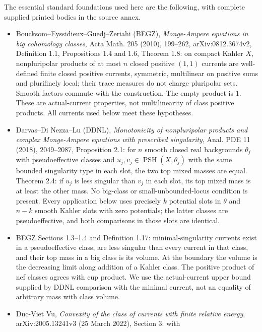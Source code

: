 \documentclass[
  11pt,
]{article}
\providecommand{\tightlist}{%
  \setlength{\itemsep}{0pt}\setlength{\parskip}{0pt}}
\begin{document}
The essential standard foundations used here are the following, with
complete supplied printed bodies in the source annex.

\begin{itemize}
\tightlist
\item
  Boucksom--Eyssidieux--Guedj--Zeriahi (BEGZ), \emph{Monge-Ampere
  equations in big cohomology classes}, Acta Math. 205 (2010), 199--262,
  arXiv:0812.3674v2, Definition 1.1, Propositions 1.4 and 1.6, Theorem
  1.8: on compact Kahler \(X\), nonpluripolar products of at most \(n\)
  closed positive \((1,1)\) currents are well-defined finite closed
  positive currents, symmetric, multilinear on positive sums and
  plurifinely local; their trace measures do not charge pluripolar sets.
  Smooth factors commute with the construction. The empty product is
  \(1\). These are actual-current properties, not multilinearity of
  class positive products. All currents used below meet these
  hypotheses.
\item
  Darvas--Di Nezza--Lu (DDNL), \emph{Monotonicity of nonpluripolar
  products and complex Monge-Ampere equations with prescribed
  singularity}, Anal. PDE 11 (2018), 2049--2087, Proposition 2.1: for
  \(n\) smooth closed real backgrounds \(\theta_j\) with pseudoeffective
  classes and \(u_j,v_j\in\operatorname{PSH}(X,\theta_j)\) with the same
  bounded singularity type in each slot, the two top mixed masses are
  equal. Theorem 2.4: if \(u_j\) is less singular than \(v_j\) in each
  slot, its top mixed mass is at least the other mass. No big-class or
  small-unbounded-locus condition is present. Every application below
  uses precisely \(k\) potential slots in \(\theta\) and \(n-k\) smooth
  Kahler slots with zero potentials; the latter classes are
  pseudoeffective, and both comparisons in those slots are identical.
\item
  BEGZ Sections 1.3--1.4 and Definition 1.17: minimal-singularity
  currents exist in a pseudoeffective class, are less singular than
  every current in that class, and their top mass in a big class is its
  volume. At the boundary the volume is the decreasing limit along
  addition of a Kahler class. The positive product of nef classes agrees
  with cup product. We use the actual-current upper bound supplied by
  DDNL comparison with the minimal current, not an equality of arbitrary
  mass with class volume.
\item
  Duc-Viet Vu, \emph{Convexity of the class of currents with finite
  relative energy}, arXiv:2005.13241v3 (25 March 2022), Section 3: with

\end{itemize}
\end{document}
